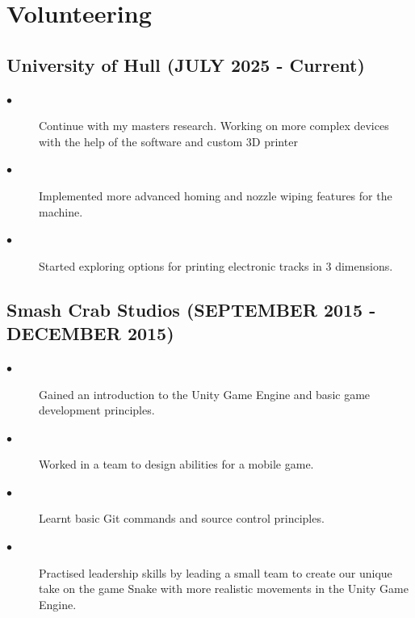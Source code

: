 \documentclass{article}
\begin{document}
\section{Volunteering}
\noindent
\hfill
\begin{minipage}[t]{1\textwidth}
    \subsection{University of Hull \footnotesize{(JULY 2025 - Current)}}
    \normalsize{}
    \begin{description}
        \item[$\bullet$] Continue with my masters research. Working on more complex devices with the help of the software and custom 3D printer
        \item[$\bullet$] Implemented more advanced homing and nozzle wiping features for the machine. 
        \item[$\bullet$] Started exploring options for printing electronic tracks in 3 dimensions. 
    \end{description}

    \subsection{Smash Crab Studios \footnotesize{(SEPTEMBER 2015 - DECEMBER 2015)}}
    \normalsize{}
    \begin{description}
        \item[$\bullet$] Gained an introduction to the Unity Game Engine and basic game development principles. 
        \item[$\bullet$] Worked in a team to design abilities for a mobile game.  
        \item[$\bullet$] Learnt basic Git commands and source control principles.
        \item[$\bullet$] Practised leadership skills by leading a small team to create our unique take on the game Snake with more realistic movements in the Unity Game Engine. 
    \end{description}

\end{minipage}
\end{document}
